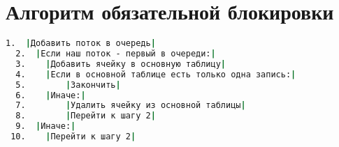 \section{Алгоритм обязательной блокировки}

\begin{lstlisting}[language=csh,caption={Алгоритм Cassandra.GetLock(lockId, threadId)}]
  1.  |Добавить поток в очередь|
  2.  |Если наш поток - первый в очереди:|
  3.  	|Добавить ячейку в основную таблицу|
  4.  	|Если в основной таблице есть только одна запись:|
  5.  		|Закончить|
  6.  	|Иначе:|
  7.  		|Удалить ячейку из основной таблицы|
  8.  		|Перейти к шагу 2|
  9.  |Иначе:|
 10.  	|Перейти к шагу 2|

\end{lstlisting}